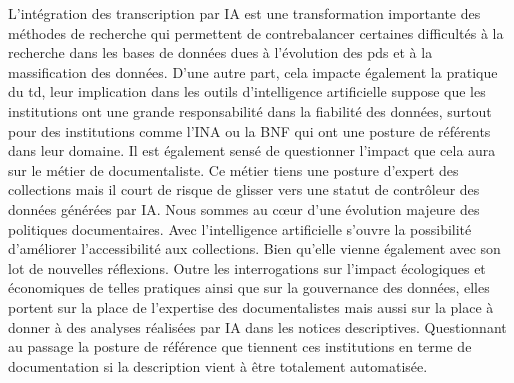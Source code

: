 
L'intégration des transcription par IA est une transformation importante des méthodes de recherche qui permettent de contrebalancer certaines difficultés à la recherche dans les bases de données dues à l'évolution des \gls{pd}s et à la massification des données. D'une autre part, cela impacte également la pratique du \gls{td}, leur implication dans les outils d'intelligence artificielle suppose que les institutions ont une grande responsabilité dans la fiabilité des données, surtout pour des institutions comme l'INA ou la BNF qui ont une posture de référents dans leur domaine. Il est également sensé de questionner l'impact que cela aura sur le métier de documentaliste. Ce métier tiens une posture d'expert des collections mais il court de risque de glisser vers une statut de contrôleur des données générées par IA. Nous sommes au cœur d'une évolution majeure des politiques documentaires. Avec l'intelligence artificielle s'ouvre la possibilité d'améliorer l'accessibilité aux collections. Bien qu'elle vienne également avec son lot de nouvelles réflexions. Outre les interrogations sur l'impact écologiques et économiques de telles pratiques ainsi que sur la gouvernance des données, elles portent sur la place de l'expertise des documentalistes mais aussi sur la place à donner à des analyses réalisées par IA dans les notices descriptives. Questionnant au passage la posture de référence que tiennent ces institutions en terme de documentation si la description vient à être totalement automatisée. 
